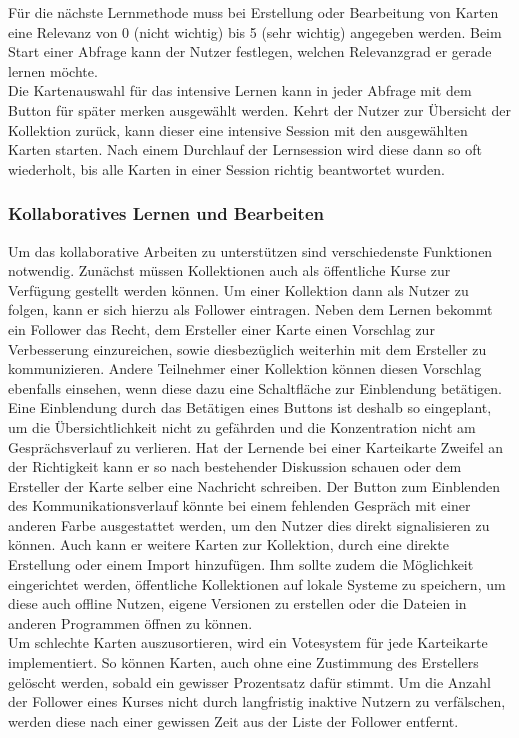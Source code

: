 \noindent Für die nächste Lernmethode muss bei Erstellung oder Bearbeitung von Karten eine Relevanz von 0 (nicht wichtig) bis 5 (sehr wichtig) angegeben werden. Beim Start einer Abfrage kann der Nutzer festlegen, welchen Relevanzgrad er gerade lernen möchte. \\

\noindent Die Kartenauswahl für das intensive Lernen kann in jeder Abfrage mit dem Button \glqq für später merken\grqq{} ausgewählt werden. Kehrt der Nutzer zur Übersicht der Kollektion zurück, kann dieser eine intensive Session mit den ausgewählten Karten starten. Nach einem Durchlauf der Lernsession wird diese dann so oft wiederholt, bis alle Karten in einer Session richtig beantwortet wurden.


\subsubsection{Kollaboratives Lernen und Bearbeiten}
Um das kollaborative Arbeiten zu unterstützen sind verschiedenste Funktionen notwendig. Zunächst müssen Kollektionen auch als öffentliche Kurse zur Verfügung gestellt werden können. 
Um einer Kollektion dann als Nutzer zu folgen, kann er sich hierzu als Follower eintragen. Neben dem Lernen bekommt ein Follower das Recht, dem Ersteller einer Karte einen Vorschlag zur Verbesserung einzureichen, sowie diesbezüglich weiterhin mit dem Ersteller zu kommunizieren. Andere Teilnehmer einer Kollektion können diesen Vorschlag ebenfalls einsehen, wenn diese dazu eine Schaltfläche zur Einblendung betätigen. Eine Einblendung durch das Betätigen eines Buttons ist deshalb so eingeplant, um die Übersichtlichkeit nicht zu gefährden und die Konzentration nicht am Gesprächsverlauf zu verlieren. Hat der Lernende bei einer Karteikarte Zweifel an der Richtigkeit kann er so nach bestehender Diskussion schauen oder dem Ersteller der Karte selber eine Nachricht schreiben. Der Button zum Einblenden des Kommunikationsverlauf könnte bei einem fehlenden Gespräch mit einer anderen Farbe ausgestattet werden, um den Nutzer dies direkt signalisieren zu können.
Auch kann er weitere Karten zur Kollektion, durch eine direkte Erstellung oder einem Import hinzufügen. Ihm sollte zudem die Möglichkeit eingerichtet werden, öffentliche Kollektionen auf lokale Systeme zu speichern, um diese auch offline Nutzen, eigene Versionen zu erstellen oder die Dateien in anderen Programmen öffnen zu können. \\

\noindent Um schlechte Karten auszusortieren, wird ein Votesystem für jede Karteikarte implementiert. So können Karten, auch ohne eine Zustimmung des Erstellers gelöscht werden, sobald ein gewisser Prozentsatz dafür stimmt. Um die Anzahl der Follower eines Kurses nicht durch langfristig inaktive Nutzern zu verfälschen, werden diese nach einer gewissen Zeit aus der Liste der Follower entfernt. 

